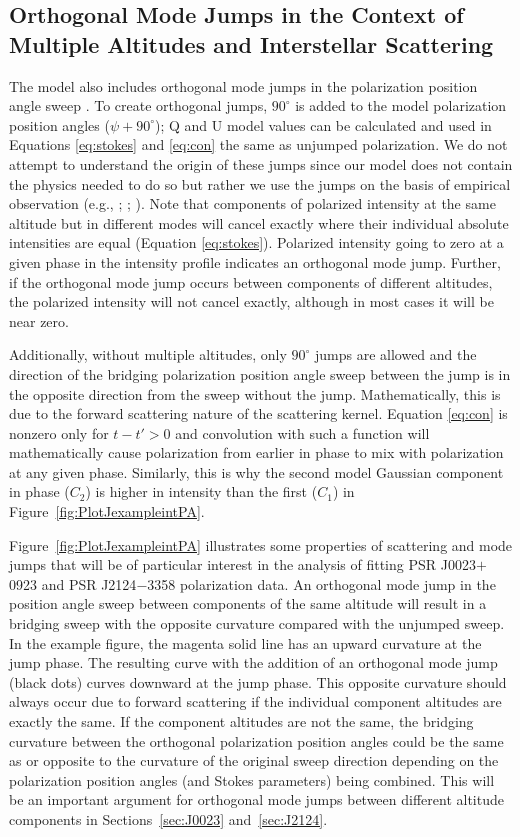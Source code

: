 \subsection{Orthogonal Mode Jumps in the Context of Multiple Altitudes and Interstellar Scattering}
\label{sec:MAISOM}
The model also includes orthogonal mode jumps in the polarization position
angle sweep \citep{backer1976orthogonal}. 
To create orthogonal jumps, $90^\circ$ is added to the model 
polarization position angles ($\psi+90^\circ$); Q and U model values can be
calculated and used in Equations \ref{eq:stokes} and \ref{eq:con} the
same as unjumped polarization.
We do not attempt to understand the origin of
these jumps since our model does not contain the physics needed to do so
but rather we use the jumps on the basis of empirical observation (e.g.,
\citealt{stinebring1984pulsar}; \citealt{gould1998multifrequency}; \citealt{karastergiou2005polarization}).
Note that components of polarized intensity at the same altitude but in different
modes will cancel exactly where their individual absolute intensities are equal (Equation \ref{eq:stokes}).
Polarized intensity going to zero at a given phase in the intensity profile
indicates an orthogonal mode jump.  Further, if the orthogonal mode 
jump occurs between components of different altitudes, the polarized intensity 
will not cancel exactly, although in most cases it will be near zero.


Additionally, without multiple altitudes, only $90^\circ$ jumps are allowed
and the direction of the bridging polarization position angle sweep between the jump is in the opposite direction from the sweep
without the jump.
Mathematically, this is due to the forward scattering nature
of the scattering kernel.  Equation \ref{eq:con} is nonzero
only for $t-t'>0$ and convolution with such a function
will mathematically cause polarization from earlier in phase to mix
with polarization at any given phase.
Similarly, this is why the second model Gaussian component
in phase ($C_2$) is higher in intensity than the first ($C_1$)
in Figure~\ref{fig:PlotJexampleintPA}. 
 
Figure~\ref{fig:PlotJexampleintPA} illustrates some properties
of scattering and mode jumps that will be of particular interest in
the analysis of fitting PSR J0023$+$0923 and PSR J2124$-$3358 polarization data.  An orthogonal mode jump
in the position angle sweep between components of the same altitude
will result in a bridging sweep with the opposite curvature compared
with the unjumped sweep.  In the example figure, the magenta solid line
has an upward curvature at the jump phase.  The resulting curve with the
addition of an orthogonal mode jump (black dots) curves downward at the jump
phase.  This opposite curvature should always occur
due to forward scattering if the individual component altitudes
are exactly the same.  If the component altitudes are not
the same, the bridging curvature between the orthogonal polarization position
angles could be the same as or opposite to the curvature of the original sweep
direction depending on the polarization position angles (and Stokes parameters) being
combined.  This will be an important argument for orthogonal
mode jumps between different altitude components in Sections~\ref{sec:J0023}
and~\ref{sec:J2124}.


